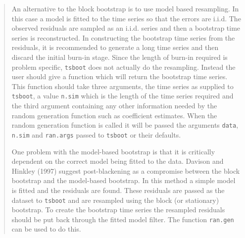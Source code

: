 \documentclass[]{book}
\theoremstyle{definition}
\theoremstyle{definition}
\theoremstyle{definition}
\theoremstyle{remark}
\begin{document}
\begin{quote}
An alternative to the block bootstrap is to use model based resampling.
In this case a model is fitted to the time series so that the errors are
i.i.d. The observed residuals are sampled as an i.i.d. series and then a
bootstrap time series is reconstructed. In constructing the bootstrap
time series from the residuals, it is recommended to generate a long
time series and then discard the initial burn-in stage. Since the length
of burn-in required is problem specific, \texttt{tsboot} does not
actually do the resampling. Instead the user should give a function
which will return the bootstrap time series. This function should take
three arguments, the time series as supplied to \texttt{tsboot}, a value
\texttt{n.sim} which is the length of the time series required and the
third argument containing any other information needed by the random
generation function such as coefficient estimates. When the random
generation function is called it will be passed the arguments
\texttt{data}, \texttt{n.sim} and \texttt{ran.args} passed to
\texttt{tsboot} or their defaults.

One problem with the model-based bootstrap is that it is critically
dependent on the correct model being fitted to the data. Davison and
Hinkley (1997) suggest post-blackening as a compromise between the block
bootstrap and the model-based bootstrap. In this method a simple model
is fitted and the residuals are found. These residuals are passed as the
dataset to \texttt{tsboot} and are resampled using the block (or
stationary) bootstrap. To create the bootstrap time series the resampled
residuals should be put back through the fitted model filter. The
function \texttt{ran.gen} can be used to do this.
\end{quote}
\end{document}
